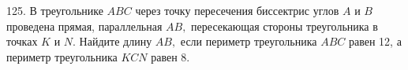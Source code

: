 125. В треугольнике $ABC$ через точку пересечения биссектрис углов $A$ и $B$ проведена прямая, параллельная $AB,$ пересекающая стороны треугольника в точках $K$ и $N.$ Найдите длину $AB,$ если периметр треугольника $ABC$ равен 12, а периметр треугольника $KCN$ равен 8.\\
